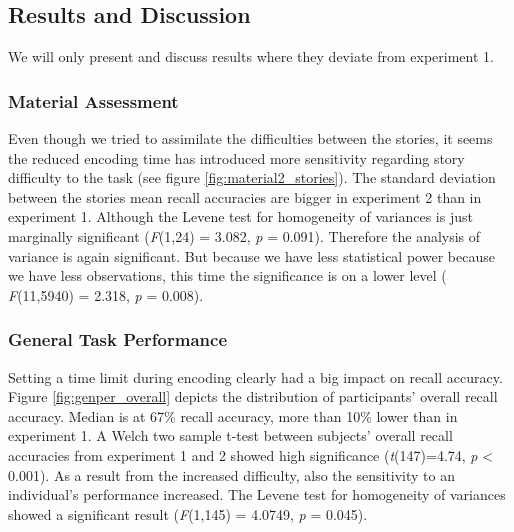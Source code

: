\documentclass[a4paper,man,natbib,floatsintext,import]{apa6}
\begin{document}
\subsection{Results and Discussion}
We will only present and discuss results where they deviate from experiment 1.

\subsubsection{Material Assessment}
Even though we tried to assimilate the difficulties between the stories, it seems the reduced encoding time has introduced more sensitivity regarding story difficulty to the task (see figure \ref{fig:material2_stories}). The standard deviation between the stories mean recall accuracies are bigger in experiment 2 than in experiment 1. Although the Levene test for homogeneity of variances is just marginally significant (\textit{F}(1,24) = 3.082, \textit{p} = 0.091). Therefore the analysis of variance is again significant. But because we have less statistical power because we have less observations, this time the significance is on a lower level ( \textit{F}(11,5940) = 2.318, \textit{p} = 0.008).

\subsubsection{General Task Performance}
Setting a time limit during encoding clearly had a big impact on recall accuracy. Figure \ref{fig:genper_overall} depicts the distribution of participants' overall recall accuracy. Median is at 67\% recall accuracy, more than 10\% lower than in experiment 1. A Welch two sample t-test between subjects' overall recall accuracies from experiment 1 and 2 showed high significance (\textit{t}(147)=4.74, \textit{p} < 0.001). As a result from the increased difficulty, also the sensitivity to an individual's performance increased. The Levene test for homogeneity of variances showed a significant result (\textit{F}(1,145) = 4.0749, \textit{p} = 0.045).
\end{document}
